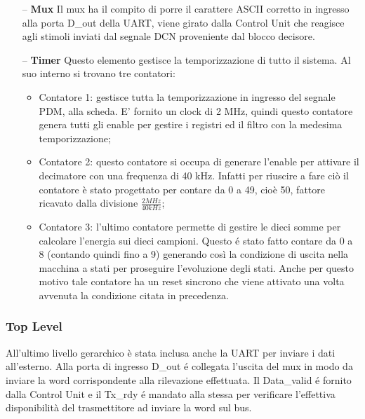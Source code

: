 \documentclass[a4paper, titlepage]{article}
\begin{document}
\begin{itemize}
    \item [--] \textbf{Mux}
    \newline
    Il mux ha il compito di porre il carattere ASCII corretto in ingresso alla porta D\_out della UART, viene girato dalla Control Unit che reagisce agli stimoli inviati dal segnale DCN proveniente dal blocco decisore.
    \item [--] \textbf{Timer}
    \newline
    Questo elemento gestisce la temporizzazione di tutto il sistema. Al suo interno si trovano tre contatori:
    \begin{itemize}
        \item Contatore 1:
        \newline
        gestisce tutta la temporizzazione in ingresso del segnale PDM, alla scheda. E' fornito un clock di 2 MHz, quindi questo contatore genera tutti gli enable per gestire i registri ed il filtro con la medesima temporizzazione;
        \item Contatore 2:
        \newline
        questo contatore si occupa di generare l'enable per attivare il decimatore con una frequenza di 40 kHz. Infatti per riuscire a fare ciò il contatore è stato progettato per contare da 0 a 49, cioè 50, fattore ricavato dalla divisione $\frac{2 MHz}{40 kHz}$;
        \item Contatore 3:
        \newline
        l'ultimo contatore permette di gestire le dieci somme per calcolare l'energia sui dieci campioni. Questo é stato fatto contare da 0 a 8 (contando quindi fino a 9) generando così la condizione di uscita nella macchina a stati per proseguire l'evoluzione degli stati. Anche per questo motivo tale contatore ha un reset sincrono che viene attivato una volta avvenuta la condizione citata in precedenza.
    \end{itemize}
    
\end{itemize}

\subsubsection{\textbf{Top Level}}
All'ultimo livello gerarchico è stata inclusa anche la UART per inviare i dati all'esterno. Alla porta di ingresso D\_out é collegata l'uscita del mux in modo da inviare la word corrispondente alla rilevazione effettuata. Il Data\_valid é fornito dalla Control Unit e il Tx\_rdy é mandato alla stessa per verificare l'effettiva disponibilità del trasmettitore ad inviare la word sul bus.
\end{document}
